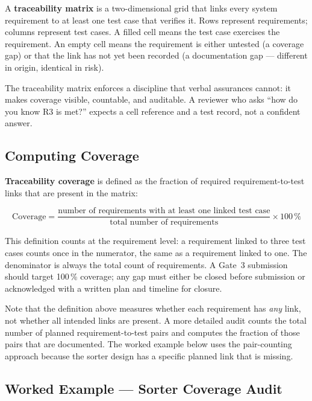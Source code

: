 A \textbf{traceability matrix} is a two-dimensional
grid that links every system requirement to at least one test case that verifies
it.
Rows represent requirements; columns represent test cases.
A filled cell means the test case exercises the requirement.
An empty cell means the requirement is either untested (a coverage gap) or that
the link has not yet been recorded (a documentation gap --- different in origin,
identical in risk).

The traceability matrix enforces a discipline that verbal assurances cannot:
it makes coverage visible, countable, and auditable.
A reviewer who asks ``how do you know R3 is met?'' expects a cell reference and
a test record, not a confident answer.

\subsection{Computing Coverage}
\label{sec:ch16-coverage-calc}

\textbf{Traceability coverage} is defined as the
fraction of required requirement-to-test links that are present in the matrix:

\begin{equation}\label{eq:ch16-coverage}
  \text{Coverage} = \frac{\text{number of requirements with at least one linked
  test case}}{\text{total number of requirements}} \times 100\,\%
\end{equation}

This definition counts at the requirement level: a requirement linked to three
test cases counts once in the numerator, the same as a requirement linked to
one.
The denominator is always the total count of requirements.
A Gate~3 submission should target 100\,\% coverage; any gap must either be
closed before submission or acknowledged with a written plan and timeline for
closure.

Note that the definition above measures whether each requirement has \emph{any}
link, not whether all intended links are present.
A more detailed audit counts the total number of planned requirement-to-test
pairs and computes the fraction of those pairs that are documented.
The worked example below uses the pair-counting approach because the sorter
design has a specific planned link that is missing.

\subsection{Worked Example --- Sorter Coverage Audit}
\label{sec:ch16-traceability-worked}

